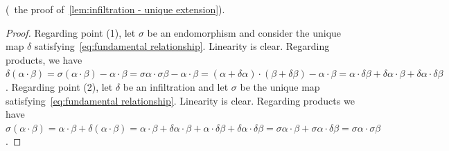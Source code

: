 (\cf~the proof of~\cref{lem:infiltration - unique extension}).
%
\begin{proof}
    Regarding point (1), let $\sigma$ be an endomorphism
    and consider the unique map $\delta$ satisfying~\cref{eq:fundamental relationship}.
    Linearity is clear.
    Regarding products, we have
        $\delta (\alpha \cdot \beta)
        = \sigma (\alpha \cdot \beta) - \alpha \cdot \beta
        = \sigma \alpha \cdot \sigma \beta - \alpha \cdot \beta
        = (\alpha + \delta \alpha) \cdot (\beta + \delta \beta) - \alpha \cdot \beta
        = \alpha \cdot \delta \beta + \delta \alpha \cdot \beta + \delta \alpha \cdot \delta \beta$.
    Regarding point (2), let $\delta$ be an infiltration
    and let $\sigma$ be the unique map satisfying~\cref{eq:fundamental relationship}.
    Linearity is clear.
    Regarding products we have
        $\sigma (\alpha \cdot \beta)
            = \alpha \cdot \beta + \delta (\alpha \cdot \beta)
            = \alpha \cdot \beta + \delta \alpha \cdot \beta + \alpha \cdot \delta \beta + \delta \alpha \cdot \delta \beta
            = \sigma \alpha \cdot \beta + \sigma \alpha \cdot \delta \beta
            = \sigma \alpha \cdot \sigma \beta$.
\end{proof}

